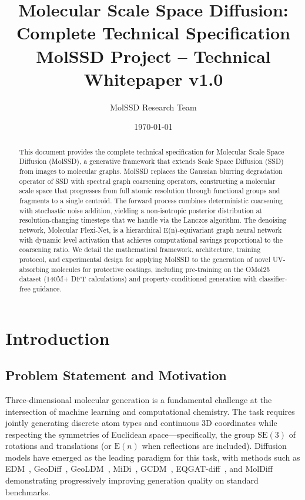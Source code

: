 \documentclass[12pt,a4paper]{article}
\title{\textbf{Molecular Scale Space Diffusion:\\Complete Technical Specification}\\[0.5em]
\large MolSSD Project -- Technical Whitepaper v1.0}
\author{MolSSD Research Team}
\date{\today}
\begin{document}
\maketitle

\begin{abstract}
This document provides the complete technical specification for Molecular Scale Space Diffusion (MolSSD), a generative framework that extends Scale Space Diffusion (SSD)~\cite{ssd2026} from images to molecular graphs. MolSSD replaces the Gaussian blurring degradation operator of SSD with spectral graph coarsening operators, constructing a molecular scale space that progresses from full atomic resolution through functional groups and fragments to a single centroid. The forward process combines deterministic coarsening with stochastic noise addition, yielding a non-isotropic posterior distribution at resolution-changing timesteps that we handle via the Lanczos algorithm. The denoising network, Molecular Flexi-Net, is a hierarchical E(n)-equivariant graph neural network with dynamic level activation that achieves computational savings proportional to the coarsening ratio. We detail the mathematical framework, architecture, training protocol, and experimental design for applying MolSSD to the generation of novel UV-absorbing molecules for protective coatings, including pre-training on the OMol25 dataset (140M+ DFT calculations) and property-conditioned generation with classifier-free guidance.
\end{abstract}

\tableofcontents
\newpage

\section{Introduction}\label{sec:intro}

\subsection{Problem Statement and Motivation}

Three-dimensional molecular generation is a fundamental challenge at the intersection of machine learning and computational chemistry. The task requires jointly generating discrete atom types and continuous 3D coordinates while respecting the symmetries of Euclidean space---specifically, the group $\mathrm{SE}(3)$ of rotations and translations (or $\mathrm{E}(n)$ when reflections are included). Diffusion models have emerged as the leading paradigm for this task, with methods such as EDM~\cite{hoogeboom2022edm}, GeoDiff~\cite{xu2023geodiff}, GeoLDM~\cite{xu2023geoldm}, MiDi~\cite{vignac2023midi}, GCDM~\cite{morehead2024gcdm}, EQGAT-diff~\cite{le2024eqgat}, and MolDiff~\cite{peng2023moldiff} demonstrating progressively improving generation quality on standard benchmarks.
\end{document}
